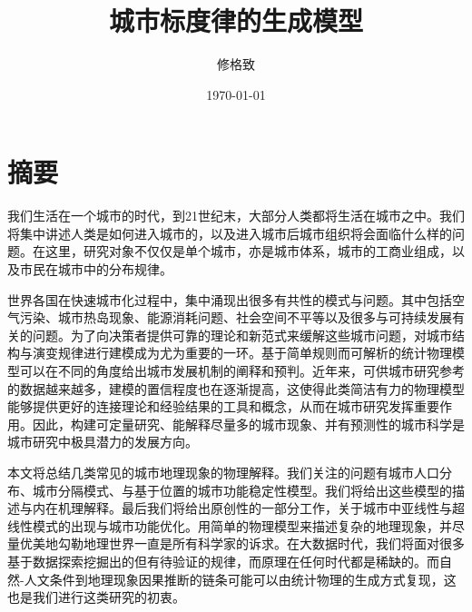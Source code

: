 \documentclass[utf8,oneside]{ctexbook}
\title{城市标度律的生成模型}
\author{修格致}
\date{\today}
\begin{document}
\begin{titlepage}
    \maketitle
\end{titlepage}

\chapter*{摘要}

我们生活在一个城市的时代，到21世纪末，大部分人类都将生活在城市之中。我们将集中讲述人类是如何进入城市的，以及进入城市后城市组织将会面临什么样的问题。在这里，研究对象不仅仅是单个城市，亦是城市体系，城市的工商业组成，以及市民在城市中的分布规律。

世界各国在快速城市化过程中，集中涌现出很多有共性的模式与问题。其中包括空气污染、城市热岛现象、能源消耗问题、社会空间不平等以及很多与可持续发展有关的问题。为了向决策者提供可靠的理论和新范式来缓解这些城市问题，对城市结构与演变规律进行建模成为尤为重要的一环。基于简单规则而可解析的统计物理模型可以在不同的角度给出城市发展机制的阐释和预判。近年来，可供城市研究参考的数据越来越多，建模的置信程度也在逐渐提高，这使得此类简洁有力的物理模型能够提供更好的连接理论和经验结果的工具和概念，从而在城市研究发挥重要作用。因此，构建可定量研究、能解释尽量多的城市现象、并有预测性的城市科学是城市研究中极具潜力的发展方向。

本文将总结几类常见的城市地理现象的物理解释。我们关注的问题有城市人口分布、城市分隔模式、与基于位置的城市功能稳定性模型。我们将给出这些模型的描述与内在机理解释。最后我们将给出原创性的一部分工作，关于城市中亚线性与超线性模式的出现与城市功能优化。用简单的物理模型来描述复杂的地理现象，并尽量优美地勾勒地理世界一直是所有科学家的诉求。在大数据时代，我们将面对很多基于数据探索挖掘出的但有待验证的规律，而原理在任何时代都是稀缺的。而自然-人文条件到地理现象因果推断的链条可能可以由统计物理的生成方式复现，这也是我们进行这类研究的初衷。

\tableofcontents










\end{document}
